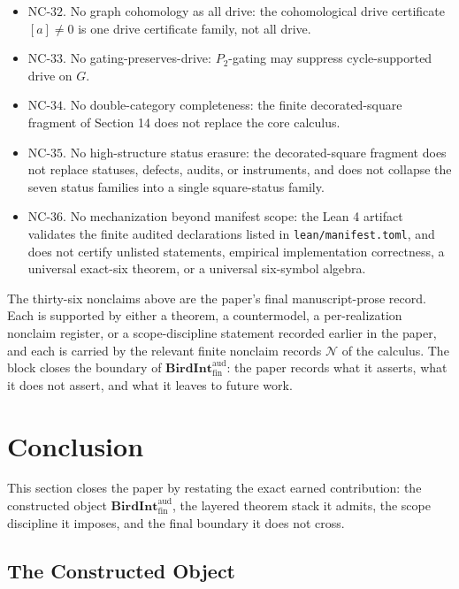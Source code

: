 \documentclass[11pt]{article}
\theoremstyle{definition}
\begin{document}
\begin{itemize}
\item
  \(\mathrm{NC}\text{-}32\). No graph cohomology as all drive: the cohomological drive certificate \([a]\neq 0\) is one drive certificate family, not all drive.
\item
  \(\mathrm{NC}\text{-}33\). No gating-preserves-drive: \(P_{2}\)-gating may suppress cycle-supported drive on \(G\).
\item
  \(\mathrm{NC}\text{-}34\). No double-category completeness: the finite decorated-square fragment of Section 14 does not replace the core calculus.
\item
  \(\mathrm{NC}\text{-}35\). No high-structure status erasure: the decorated-square fragment does not replace statuses, defects, audits, or instruments, and does not collapse the seven status families into a single square-status family.
\item
  \(\mathrm{NC}\text{-}36\). No mechanization beyond manifest scope: the Lean 4 artifact validates the finite audited declarations listed in \texttt{lean/manifest.toml}, and does not certify unlisted statements, empirical implementation correctness, a universal exact-six theorem, or a universal six-symbol algebra.
\end{itemize}

The thirty-six nonclaims above are the paper's final manuscript-prose record. Each is supported by either a theorem, a countermodel, a per-realization nonclaim register, or a scope-discipline statement recorded earlier in the paper, and each is carried by the relevant finite nonclaim records \(\mathcal N\) of the calculus. The block closes the boundary of \(\mathbf{BirdInt}^{\mathrm{aud}}_{\mathrm{fin}}\): the paper records what it asserts, what it does not assert, and what it leaves to future work.
 \section{Conclusion}

This section closes the paper by restating the exact earned contribution: the constructed object \(\mathbf{BirdInt}^{\mathrm{aud}}_{\mathrm{fin}}\), the layered theorem stack it admits, the scope discipline it imposes, and the final boundary it does not cross.

\subsection{The Constructed Object}
\end{document}
